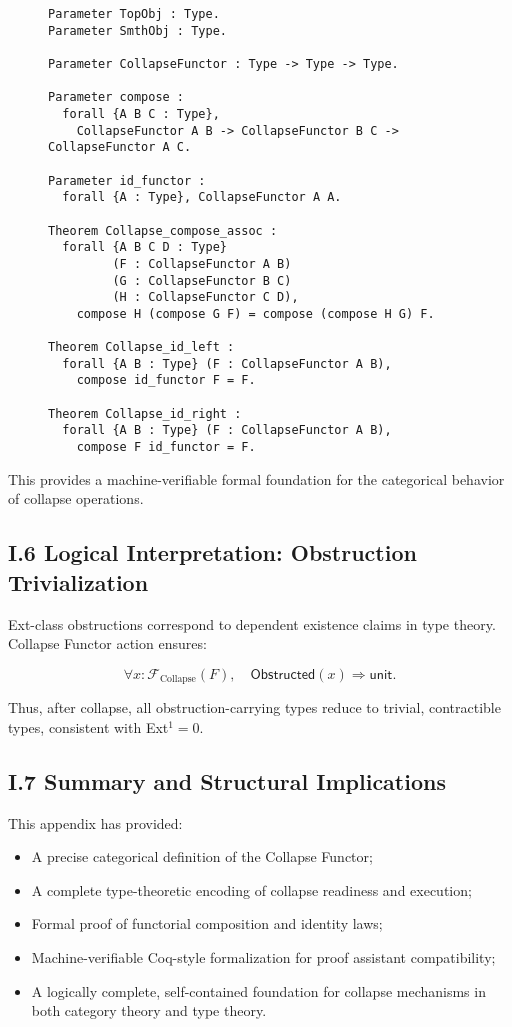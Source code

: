\documentclass[11pt]{article}
\begin{document}
\begin{figure}[h]
\centering
\begin{lstlisting}[language=Coq, mathescape=false]
Parameter TopObj : Type.
Parameter SmthObj : Type.

Parameter CollapseFunctor : Type -> Type -> Type.

Parameter compose :
  forall {A B C : Type},
    CollapseFunctor A B -> CollapseFunctor B C -> CollapseFunctor A C.

Parameter id_functor :
  forall {A : Type}, CollapseFunctor A A.

Theorem Collapse_compose_assoc :
  forall {A B C D : Type}
         (F : CollapseFunctor A B)
         (G : CollapseFunctor B C)
         (H : CollapseFunctor C D),
    compose H (compose G F) = compose (compose H G) F.

Theorem Collapse_id_left :
  forall {A B : Type} (F : CollapseFunctor A B),
    compose id_functor F = F.

Theorem Collapse_id_right :
  forall {A B : Type} (F : CollapseFunctor A B),
    compose F id_functor = F.
\end{lstlisting}
\end{figure}

This provides a machine-verifiable formal foundation for the categorical behavior of collapse operations.

\subsection*{I.6 Logical Interpretation: Obstruction Trivialization}

Ext-class obstructions correspond to dependent existence claims in type theory. Collapse Functor action ensures:

\[
\forall x : \mathcal{F}_{\mathrm{Collapse}}(F), \quad \mathsf{Obstructed}(x) \Rightarrow \mathsf{unit}.
\]

Thus, after collapse, all obstruction-carrying types reduce to trivial, contractible types, consistent with Ext$^1 = 0$.

\subsection*{I.7 Summary and Structural Implications}

This appendix has provided:

\begin{itemize}
    \item A precise categorical definition of the Collapse Functor;
    \item A complete type-theoretic encoding of collapse readiness and execution;
    \item Formal proof of functorial composition and identity laws;
    \item Machine-verifiable Coq-style formalization for proof assistant compatibility;
    \item A logically complete, self-contained foundation for collapse mechanisms in both category theory and type theory.
\end{itemize}
\end{document}
